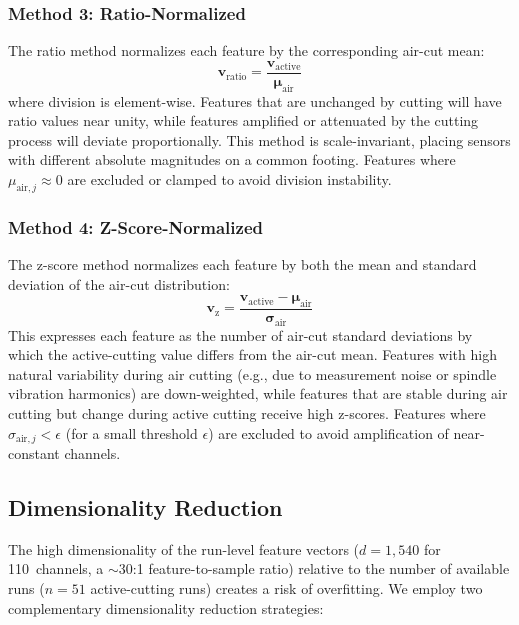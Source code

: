 \subsubsection{Method 3: Ratio-Normalized}

The ratio method normalizes each feature by the corresponding air-cut mean:
\begin{equation}\label{eq:ratio}
    \mathbf{v}_\text{ratio} = \frac{\mathbf{v}_\text{active}}{\boldsymbol{\mu}_\text{air}}
\end{equation}
where division is element-wise. Features that are unchanged by cutting will have ratio values near unity, while features amplified or attenuated by the cutting process will deviate proportionally. This method is scale-invariant, placing sensors with different absolute magnitudes on a common footing. Features where $\mu_{\text{air},j} \approx 0$ are excluded or clamped to avoid division instability.

\subsubsection{Method 4: Z-Score-Normalized}

The z-score method normalizes each feature by both the mean and standard deviation of the air-cut distribution:
\begin{equation}\label{eq:zscore}
    \mathbf{v}_\text{z} = \frac{\mathbf{v}_\text{active} - \boldsymbol{\mu}_\text{air}}{\boldsymbol{\sigma}_\text{air}}
\end{equation}
This expresses each feature as the number of air-cut standard deviations by which the active-cutting value differs from the air-cut mean. Features with high natural variability during air cutting (e.g., due to measurement noise or spindle vibration harmonics) are down-weighted, while features that are stable during air cutting but change during active cutting receive high z-scores. Features where $\sigma_{\text{air},j} < \epsilon$ (for a small threshold $\epsilon$) are excluded to avoid amplification of near-constant channels.

\subsection{Dimensionality Reduction}\label{sec:dim_reduction}

The high dimensionality of the run-level feature vectors ($d = 1{,}540$ for 110~channels, a $\sim$30:1 feature-to-sample ratio) relative to the number of available runs ($n = 51$ active-cutting runs) creates a risk of overfitting. We employ two complementary dimensionality reduction strategies:

